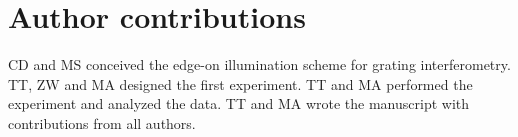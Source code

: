 \documentclass[english]{nature}
\begin{document}
\section*{Author contributions}
CD and MS conceived the edge-on illumination scheme for grating interferometry. TT, ZW and MA designed the first experiment. TT and MA performed the experiment and analyzed the data. TT and MA wrote the manuscript with contributions from all authors.
\end{document}
